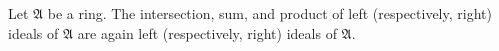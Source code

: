 Let $\mathfrak{A}$ be a ring. The intersection, sum, and product of left (respectively, right) ideals of $\mathfrak{A}$ are again left (respectively, right) ideals of $\mathfrak{A}$.
